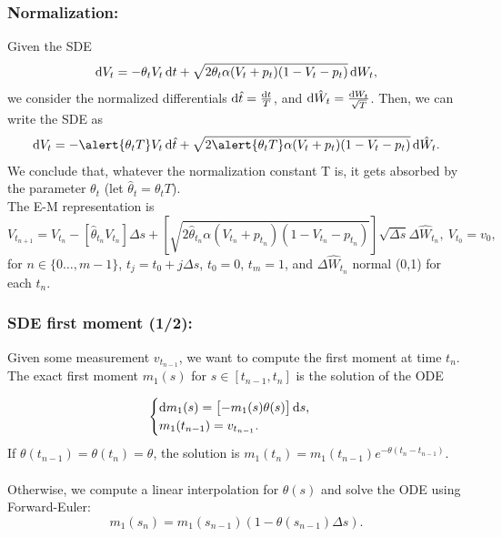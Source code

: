 \documentclass[aspectratio=169]{beamer}\usepackage[utf8]{inputenc}
\begin{document}
\begin{frame}\frametitle{Normalization:}

Given the SDE
\begin{equation*}
\dif V_t=-\theta_tV_t\dif t+\sqrt{2\theta_t\alpha(V_t+p_t)(1-V_t-p_t)}\dif W_t,
\end{equation*}
we consider the normalized differentials $\dif\hat{t}=\frac{\dif t}{T}$, and $\dif\hat{W}_t=\frac{\dif W_t}{\sqrt{T}}$. Then, we can write the SDE as
\begin{equation*}
\dif V_t=-\alert{\theta_tT}V_t\dif\hat{t}+\sqrt{2\alert{\theta_tT}\alpha(V_t+p_t)(1-V_t-p_t)}\dif\hat{W}_t.
\end{equation*}
We conclude that, whatever the normalization constant T is, it gets absorbed by the parameter $\theta_t$ (let $\hat{\theta}_t=\theta_t T$).
\quad\\
The E-M representation is
\begin{equation*}
V_{t_{n+1}}=V_{t_{n}}-\left[\hat{\theta}_{t_n}V_{t_n}\right]\Delta s+\left[\sqrt{2\hat{\theta}_{t_n}\alpha(V_{t_n}+p_{t_n})(1-V_{t_n}-p_{t_n})}\right]\sqrt{\Delta s}\Delta\hat{W}_{t_n},\ V_{t_0}=v_0,
\end{equation*}
for $n\in\{0\dots,m-1\}$, $t_j=t_0+j\Delta s$, $t_0=0$, $t_m=1$, and $\Delta\hat{W}_{t_n}$ normal (0,1) for each $t_n$.

\end{frame}


\begin{frame}\frametitle{SDE first moment (1/2):} \label{m1}

Given some measurement $v_{t_{n-1}}$, we want to compute the first moment at time $t_n$. The exact first moment $m_1(s)$ for $s\in[t_{n-1},t_n]$ is the solution of the ODE

\begin{equation*}
\begin{cases}
\dif m_1(s)=\left[-m_1(s)\theta(s)\right]\dif s,\\
m_1(t_{n-1})=v_{t_{n-1}}.
\end{cases}
\end{equation*}
If $\theta(t_{n-1})=\theta(t_{n})=\theta$, the solution is $m_1(t_n)=m_1(t_{n-1})e^{-\theta(t_n-t_{n-1})}$.\\
\quad\\
Otherwise, we compute a linear interpolation for $\theta(s)$ and solve the ODE using Forward-Euler:
\begin{equation*}
m_1(s_{n})=m_1(s_{n-1})(1-\theta(s_{n-1})\Delta s).
\end{equation*}

\end{frame}
\end{document}
